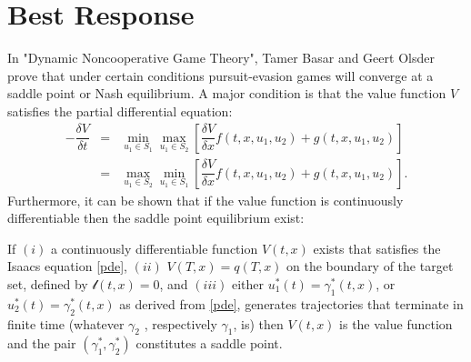 \section{Best Response}
In "Dynamic Noncooperative Game Theory", Tamer Basar and Geert Olsder prove that under certain conditions pursuit-evasion games will converge at a saddle point or Nash equilibrium. A major condition is that the value function $V$ satisfies the partial differential equation:
\begin{eqnarray}\label{pde}
-\dfrac{\delta V}{\delta t} & = & \underset{u_1 \in S_1 }{\operatorname{min }}\underset{u_1 \in S_2 }{\operatorname{max }}[\dfrac{\delta V}{\delta x}f(t,x,u_1,u_2)+g(t,x,u_1,u_2)] \\
                            & = & \underset{u_1 \in S_2 }{\operatorname{max }}\underset{u_1 \in S_1 }{\operatorname{min }}[\dfrac{\delta V}{\delta x}f(t,x,u_1,u_2)+g(t,x,u_1,u_2)].
\end{eqnarray} 
Furthermore, it can be shown that if the value function is continuously differentiable then the saddle point equilibrium exist:
\begin{theorem}\label{pethrm}
If $(i)$ a continuously differentiable function $V(t,x)$ exists that satisfies the Isaacs equation \ref{pde}, $(ii)$ $V(T,x) = q(T,x)$ on the boundary of the target set, defined by $\mathscr{l}(t,x) = 0$, and $(iii)$ either $u_1^*(t) = \gamma_1^*(t,x)$, or $u_2^*(t) = \gamma_2^*(t,x)$ as derived from \ref{pde}, generates trajectories that terminate in finite time (whatever $\gamma_2$ , respectively $\gamma_1$, is) then $V(t,x)$ is the value function and the pair $(\gamma_1^*, \gamma_2^*)$ constitutes a saddle point.
\end{theorem}

